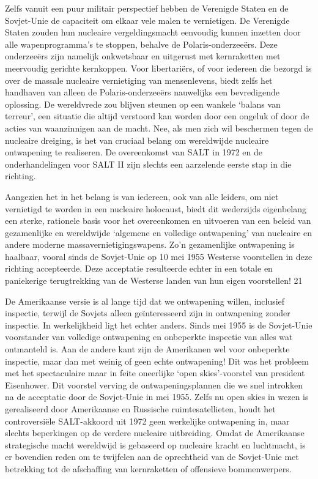 \documentclass[
  a5paper,
  smalldemyvopaper,10pt,twoside,onecolumn,openright,extrafontsizes,hidelinks]{memoir}
\begin{document}
Zelfs vanuit een puur militair perspectief hebben de Verenigde Staten en
de Sovjet-Unie de capaciteit om elkaar vele malen te vernietigen. De
Verenigde Staten zouden hun nucleaire vergeldingsmacht eenvoudig kunnen
inzetten door alle wapenprogramma's te stoppen, behalve de
Polaris-onderzeeërs. Deze onderzeeërs zijn namelijk onkwetsbaar en
uitgerust met kernraketten met meervoudig gerichte kernkoppen. Voor
libertariërs, of voor iedereen die bezorgd is over de massale nucleaire
vernietiging van mensenlevens, biedt zelfs het handhaven van alleen de
Polaris-onderzeeërs nauwelijks een bevredigende oplossing. De
wereldvrede zou blijven steunen op een wankele `balans van terreur', een
situatie die altijd verstoord kan worden door een ongeluk of door de
acties van waanzinnigen aan de macht. Nee, als men zich wil beschermen
tegen de nucleaire dreiging, is het van cruciaal belang om wereldwijde
nucleaire ontwapening te realiseren. De overeenkomst van SALT in 1972 en
de onderhandelingen voor SALT II zijn slechts een aarzelende eerste stap
in die richting.

Aangezien het in het belang is van iedereen, ook van alle leiders, om
niet vernietigd te worden in een nucleaire holocaust, biedt dit
wederzijds eigenbelang een sterke, rationele basis voor het overeenkomen
en uitvoeren van een beleid van gezamenlijke en wereldwijde `algemene en
volledige ontwapening' van nucleaire en andere moderne
massavernietigingswapens. Zo'n gezamenlijke ontwapening is haalbaar,
vooral sinds de Sovjet-Unie op 10 mei 1955 Westerse voorstellen in deze
richting accepteerde. Deze acceptatie resulteerde echter in een totale
en paniekerige terugtrekking van de Westerse landen van hun eigen
voorstellen! 21

De Amerikaanse versie is al lange tijd dat we ontwapening willen,
inclusief inspectie, terwijl de Sovjets alleen geïnteresseerd zijn in
ontwapening zonder inspectie. In werkelijkheid ligt het echter anders.
Sinds mei 1955 is de Sovjet-Unie voorstander van volledige ontwapening
en onbeperkte inspectie van alles wat ontmanteld is. Aan de andere kant
zijn de Amerikanen wel voor onbeperkte inspectie, maar dan met weinig of
geen echte ontwapening! Dit was het probleem met het spectaculaire maar
in feite oneerlijke `open skies'-voorstel van president Eisenhower. Dit
voorstel verving de ontwapeningsplannen die we snel introkken na de
acceptatie door de Sovjet-Unie in mei 1955. Zelfs nu open skies in wezen
is gerealiseerd door Amerikaanse en Russische ruimtesatellieten, houdt
het controversiële SALT-akkoord uit 1972 geen werkelijke ontwapening in,
maar slechts beperkingen op de verdere nucleaire uitbreiding. Omdat de
Amerikaanse strategische macht wereldwijd is gebaseerd op nucleaire
kracht en luchtmacht, is er bovendien reden om te twijfelen aan de
oprechtheid van de Sovjet-Unie met betrekking tot de afschaffing van
kernraketten of offensieve bommenwerpers.
\end{document}
